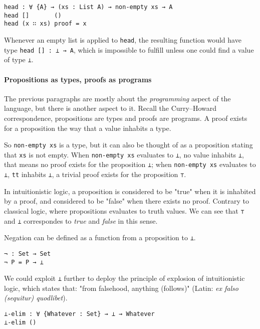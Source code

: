 \documentclass[12pt, a4paper]{article}
\begin{document}
\begin{lstlisting}
head : ∀ {A} → (xs : List A) → non-empty xs → A
head []       ()
head (x ∷ xs) proof = x
\end{lstlisting}

Whenever an empty list is applied to {\lstinline|head|},
the resulting function would have type {\lstinline|head [] : ⊥ → A|},
which is impossible to fulfill unless one could find a value of type {\lstinline|⊥|}.

\paragraph{Propositions as types, proofs as programs}

The previous paragraphs are mostly about the \textit{programming}
aspect of the language, but there is another aspect to it.
Recall the Curry–Howard correspondence, propositions are types and proofs are
programs. A proof exists for a proposition the way that a value inhabits a type.

So {\lstinline|non-empty xs|} is a type, but it can also be thought of as a
proposition stating that {\lstinline|xs|} is not empty.
When {\lstinline|non-empty xs|} evaluates to {\lstinline|⊥|}, no value inhabits
{\lstinline|⊥|}, that means no proof exists for the proposition {\lstinline|⊥|};
when {\lstinline|non-empty xs|} evaluates to {\lstinline|⊥|}, {\lstinline|tt|}
inhabits {\lstinline|⊥|}, a trivial proof exists for the proposition {\lstinline|⊤|}.

In intuitionistic logic, a proposition is considered to be "true" when it is
inhabited by a proof, and considered to be "false" when there exists no proof.
Contrary to classical logic, where propositions evaluates to truth values.
We can see that {\lstinline|⊤|} and {\lstinline|⊥|} correspondes to \textit{true}
and \textit{false} in this sense.

Negation can be defined as a function from a proposition to {\lstinline|⊥|}.

\begin{lstlisting}
¬ : Set → Set
¬ P = P → ⊥
\end{lstlisting}

We could exploit {\lstinline|⊥|} further to deploy the principle of explosion
of intuitionistic logic, which states that: "from falsehood, anything (follows)"
(Latin: \textit{ex falso (sequitur) quodlibet}).

\begin{lstlisting}
⊥-elim : ∀ {Whatever : Set} → ⊥ → Whatever
⊥-elim ()
\end{lstlisting}
\end{document}
